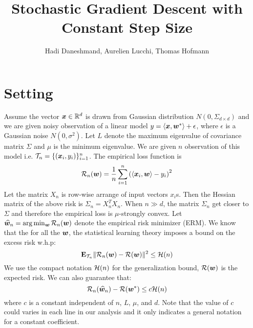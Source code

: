 \documentclass{article}
\author{
Hadi Daneshmand, Aurelien Lucchi, Thomas Hofmann
}
\begin{document}
\title{Stochastic Gradient Descent with Constant Step Size}
\maketitle

\section{Setting}
Assume the vector $\bm{x} \in \mathbb{R}^d$ is drawn from Gaussian distribution
$N(0,\Sigma_{d \times d})$ and we are given noisy observation of a
linear model $y = \langle \bm{x}, \bm{w}^* \rangle + \epsilon$, where $\epsilon$ is a
Gaussian noise $N(0,\sigma^2)$. Let $L$ denote the maximum eigenvalue of
covariance matrix $\Sigma$ and $\mu$ is the minimum eigenvalue. We are given $n$ observation of this model i.e.
 ${\cal T}_n = \{ 
(\bm{x}_i,y_i)\}_{i=1}^n$. The empirical loss function is 
\begin{equation*}
	{\cal R}_n(\bm{w}) = \frac{1}{n} \sum_{i=1}^n \left(\langle \bm{x}_i, \bm{w}\rangle -
	y_i\right)^2
\end{equation*}
Let the matrix $X_n$ is row-wise arrange of input vectors $x_i$s. Then the
Hessian matrix of the above risk is $\Sigma_n = X_n^T X_n$. When $n \gg d$, the
matrix $\Sigma_n$ get closer to $\Sigma$ and therefore the empirical loss is
$\mu$-strongly convex. Let $\widehat{\bm{w}}_n = \arg\min_{\bm{w}}{\cal R}_n(\bm{w})$ denote
the empirical risk minimizer (ERM). We know that the for all the $\bm{w}$, the
statistical learning theory imposes a bound on the excess risk w.h.p:
\begin{equation*}
	\mathbf{E}_{{\cal T}_n}\| {\cal R}_n(\bm{w})- {\cal R}(\bm{w}) \|^2 \leq
	{\cal H}(n)
\end{equation*}
We use the compact notation ${\cal H}(n)$ for the generalization bound,
${\cal R}(\bm{w})$ is the expected risk. We can also guarantee that: 
\begin{equation*}
	{\cal R}_n(\widehat{\bm{w}}_n)- {\cal R}(\bm{w}^*) \leq
	c {\cal H}(n)
\end{equation*}
where $c$ is a constant independent of $n$, $L$, $\mu$, and $d$. Note that the
value of $c$ could varies in each line in our analysis and it only indicates a
general notation for a constant coefficient. 
\end{document}
